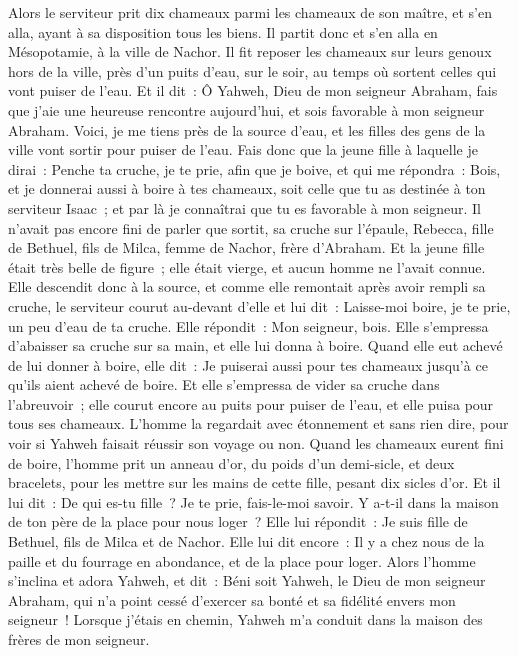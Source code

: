 \begin{multicols}{2}
Alors le serviteur prit dix chameaux parmi les chameaux de son maître, et s'en alla, ayant à sa disposition tous les biens. Il partit donc et s'en alla en Mésopotamie, à la ville de Nachor.
Il fit reposer les chameaux sur leurs genoux hors de la ville, près d'un puits d'eau, sur le soir, au temps où sortent celles qui vont puiser de l'eau.
Et il dit~: Ô Yahweh, Dieu de mon seigneur Abraham, fais que j'aie une heureuse rencontre aujourd'hui, et sois favorable à mon seigneur Abraham.
Voici, je me tiens près de la source d'eau, et les filles des gens de la ville vont sortir pour puiser de l'eau.
Fais donc que la jeune fille à laquelle je dirai~: Penche ta cruche, je te prie, afin que je boive, et qui me répondra~: Bois, et je donnerai aussi à boire à tes chameaux, soit celle que tu as destinée à ton serviteur Isaac~; et par là je connaîtrai que tu es favorable à mon seigneur.
Il n'avait pas encore fini de parler que sortit, sa cruche sur l'épaule, Rebecca, fille de Bethuel, fils de Milca, femme de Nachor, frère d'Abraham.
Et la jeune fille était très belle de figure~; elle était vierge, et aucun homme ne l'avait connue. Elle descendit donc à la source, et comme elle remontait après avoir rempli sa cruche,
le serviteur courut au-devant d'elle et lui dit~: Laisse-moi boire, je te prie, un peu d'eau de ta cruche.
Elle répondit~: Mon seigneur, bois. Elle s'empressa d'abaisser sa cruche sur sa main, et elle lui donna à boire.
Quand elle eut achevé de lui donner à boire, elle dit~: Je puiserai aussi pour tes chameaux jusqu'à ce qu'ils aient achevé de boire.
Et elle s'empressa de vider sa cruche dans l'abreuvoir~; elle courut encore au puits pour puiser de l'eau, et elle puisa pour tous ses chameaux.
L'homme la regardait avec étonnement et sans rien dire, pour voir si Yahweh faisait réussir son voyage ou non.
Quand les chameaux eurent fini de boire, l'homme prit un anneau d'or, du poids d'un demi-sicle, et deux bracelets, pour les mettre sur les mains de cette fille, pesant dix sicles d'or.
Et il lui dit~: De qui es-tu fille~? Je te prie, fais-le-moi savoir. Y a-t-il dans la maison de ton père de la place pour nous loger~?
Elle lui répondit~: Je suis fille de Bethuel, fils de Milca et de Nachor.
Elle lui dit encore~: Il y a chez nous de la paille et du fourrage en abondance, et de la place pour loger.
Alors l'homme s'inclina et adora Yahweh,
et dit~: Béni soit Yahweh, le Dieu de mon seigneur Abraham, qui n'a point cessé d'exercer sa bonté et sa fidélité envers mon seigneur~! Lorsque j'étais en chemin, Yahweh m'a conduit dans la maison des frères de mon seigneur.

\end{multicols}
